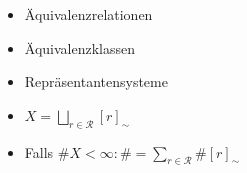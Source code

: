\documentclass[a4paper]{report}
\begin{document}
\begin{whg*}[Vorbereitung]
  \item
\begin{itemize}
\item Äquivalenzrelationen
\item Äquivalenzklassen
\item Repräsentantensysteme
\end{itemize}
\end{whg*}

\begin{bem*} \item
  \begin{itemize}
        \item $X = \bigsqcup_{r \in \mathcal R} [r]_{\sim}$
        \item Falls $\#X < \infty : \# = \sum_{r \in \mathcal R} \# [r]_{\sim}$ %
  \end{itemize}
\end{bem*}
\end{document}
